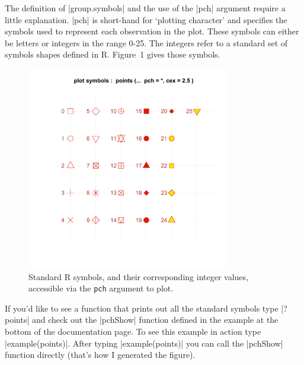 
The definition of |group.symbols| and the use of the |pch| argument require a little explanation. |pch| is short-hand for `plotting  character' and specifies the symbols used to represent each observation in the plot.  These symbols can either be letters or integers in the range 0-25. The integers refer to a standard set of symbols shapes defined in R. Figure~1 gives those symbols.

\begin{figure}
\begin{center}

\includegraphics[height=3.5in]{pch-symbols}

\end{center}
\caption{Standard R symbols, and their corresponding integer values, accessible via the \texttt{pch} argument to plot.}
\end{figure}

If you'd like to see a function that prints out all the standard symbols type |?points| and check out the |pchShow| function defined in the example at the bottom of the documentation page.  To see this example in action type |example(points)|. After typing |example(points)| you can call the |pchShow| function directly (that's how I generated the figure).

